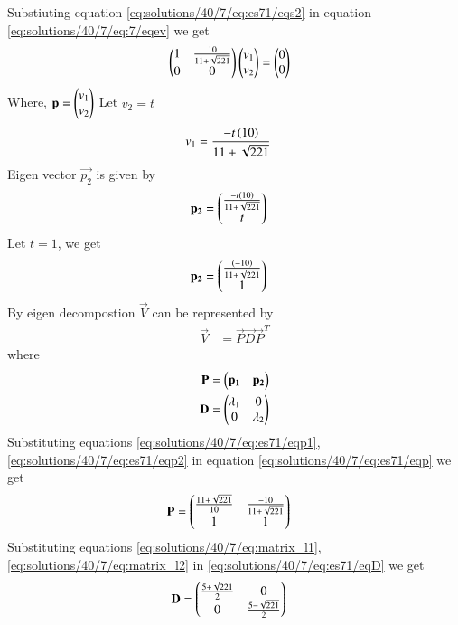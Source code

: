 Substiuting equation \ref{eq:solutions/40/7/eq:es71/eqs2} in equation \ref{eq:solutions/40/7/eq:7/eqev} we get 
\begin{align}
    &\begin{pmatrix}1 & \frac{10}{11+\sqrt{221}} \\0 & 0\end{pmatrix}\begin{pmatrix}v_1 \\ v_2\end{pmatrix}=\begin{pmatrix}0 \\ 0\end{pmatrix}
\end{align}
Where, $\mathbf{p}=\begin{pmatrix}v_1\\v_2\end{pmatrix}$
Let $v_2=t$
\begin{align}
    v_1&=\frac{-t\left(10\right)}{11+\sqrt{221}}
\end{align}
Eigen vector $\vec{p_2}$ is given by
\begin{align}
        \mathbf{p_2}&=\begin{pmatrix}\frac{-t\left(10\right)}{11+\sqrt{221}} \\ t\end{pmatrix}
\end{align}
Let $t=1$, we get 
\begin{align}
    \mathbf{p_2}&=\begin{pmatrix}\frac{\left(-10\right)}{11+\sqrt{221}} \\1 \end{pmatrix}\label{eq:solutions/40/7/eq:es71/eqp2}
\end{align}
By eigen decompostion $\vec{V}$ can be represented by
\begin{align}
    \vec{V}&=\vec{P}\vec{D}\vec{P}^T\label{eq:solutions/40/7/eq:es71/eqsubs}
\end{align}
where 
\begin{align}
        \mathbf{P}&=\begin{pmatrix}\mathbf{p_1} & \mathbf{p_2}\end{pmatrix}\label{eq:solutions/40/7/eq:es71/eqp}\\
    \mathbf{D}&=\begin{pmatrix}\lambda_1 & 0 \\0 & \lambda_2\end{pmatrix}\label{eq:solutions/40/7/eq:es71/eqD}
\end{align}
Substituting equations \ref{eq:solutions/40/7/eq:es71/eqp1}, \ref{eq:solutions/40/7/eq:es71/eqp2} in equation \ref{eq:solutions/40/7/eq:es71/eqp} we get 
\begin{align}
    \mathbf{P}&=\begin{pmatrix}\frac{11+\sqrt{221}}{10} & \frac{-10}{11+\sqrt{221}} \\1 & 1\end{pmatrix}\label{eq:solutions/40/7/eq:es71/eqP}
\end{align}
Substituting equations \ref{eq:solutions/40/7/eq:matrix_l1}, \ref{eq:solutions/40/7/eq:matrix_l2} in \ref{eq:solutions/40/7/eq:es71/eqD} we get
\begin{align}
       \mathbf{D}&=\begin{pmatrix}\frac{5+\sqrt{221}}{2} & 0\\0 & \frac{5-\sqrt{221}}{2}\end{pmatrix}\label{eq:solutions/40/7/eq:es71/eqDD}
\end{align}
